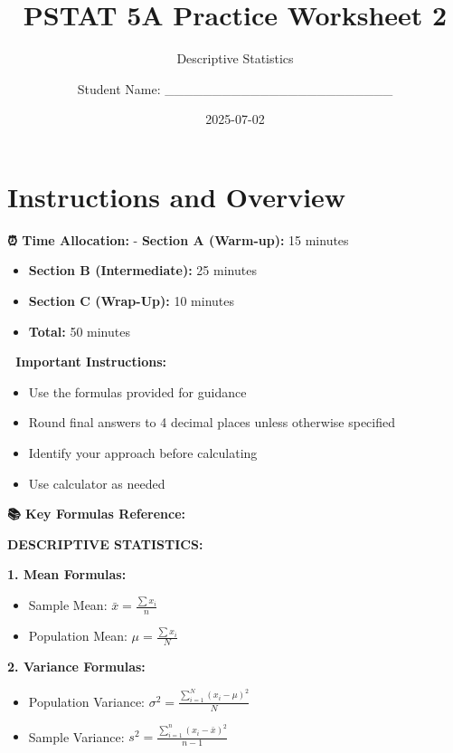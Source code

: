 \documentclass[
  11pt,
]{article}
\title{PSTAT 5A Practice Worksheet 2}
\subtitle{Descriptive Statistics}
\author{Student Name: \_\_\_\_\_\_\_\_\_\_\_\_\_\_\_\_\_\_\_\_\_\_\_\_}
\date{2025-07-02}
\renewcommand*\contentsname{Table of contents}
\newcommand\contentsname{Table of contents}
\begin{document}
\maketitle

\renewcommand*\contentsname{Table of contents}
{
\hypersetup{linkcolor=}
\setcounter{tocdepth}{3}
\tableofcontents
}

\section{Instructions and Overview}\label{instructions-and-overview}

\textbf{⏰ Time Allocation:} - \textbf{Section A (Warm-up):} 15 minutes

\begin{itemize}
\item
  \textbf{Section B (Intermediate):} 25 minutes
\item
  \textbf{Section C (Wrap-Up):} 10 minutes
\item
  \textbf{Total:} 50 minutes
\end{itemize}

\textbf{📝 Important Instructions:}

\begin{itemize}
\item
  Use the formulas provided for guidance
\item
  Round final answers to 4 decimal places unless otherwise specified
\item
  Identify your approach before calculating
\item
  Use calculator as needed
\end{itemize}

\textbf{📚 Key Formulas Reference:}

\textbf{DESCRIPTIVE STATISTICS:}

\textbf{1. Mean Formulas:}

\begin{itemize}
\item
  Sample Mean: \(\bar x = \frac{\sum x_i}{n}\)
\item
  Population Mean: \(\mu = \frac{\sum x_i}{N}\)
\end{itemize}

\textbf{2. Variance Formulas:}

\begin{itemize}
\item
  Population Variance:
  \(\sigma^2 = \frac{\sum_{i=1}^{N} (x_i - \mu)^2}{N}\)
\item
  Sample Variance:
  \(s^2 = \frac{\sum_{i=1}^{n} (x_i - \bar{x})^2}{n-1}\)
\end{itemize}
\end{document}
